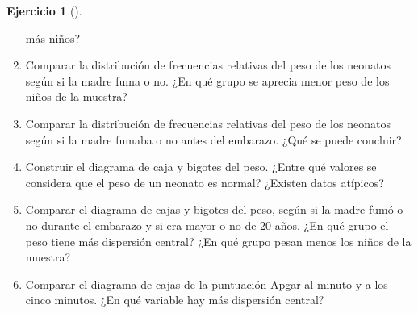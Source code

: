 \documentclass[
  spanish,
  a4paper,
]{scrreport}
\theoremstyle{definition}
\newtheorem{exercise}{Ejercicio}[chapter]
\theoremstyle{remark}
\begin{document}
\begin{exercise}[]
\begin{enumerate}
  más niños?
\item
  Comparar la distribución de frecuencias relativas del peso de los
  neonatos según si la madre fuma o no. ¿En qué grupo se aprecia menor
  peso de los niños de la muestra?
\item
  Comparar la distribución de frecuencias relativas del peso de los
  neonatos según si la madre fumaba o no antes del embarazo. ¿Qué se
  puede concluir?
\item
  Construir el diagrama de caja y bigotes del peso. ¿Entre qué valores
  se considera que el peso de un neonato es normal? ¿Existen datos
  atípicos?
\item
  Comparar el diagrama de cajas y bigotes del peso, según si la madre
  fumó o no durante el embarazo y si era mayor o no de 20 años. ¿En qué
  grupo el peso tiene más dispersión central? ¿En qué grupo pesan menos
  los niños de la muestra?
\item
  Comparar el diagrama de cajas de la puntuación Apgar al minuto y a los
  cinco minutos. ¿En qué variable hay más dispersión central?
\end{enumerate}

\end{exercise}
\end{document}
